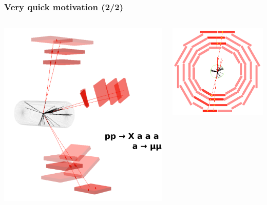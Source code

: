 \documentclass[compress]{beamer}
\begin{document}
\begin{frame}
\frametitle{Very quick motivation (2/2)}

\begin{columns}
\includegraphics[width=\linewidth]{eventdisplay_3d.pdf}

\vspace{0.5 cm}
\includegraphics[width=\linewidth]{eventdisplay_rphi.png}


\end{columns}
\end{frame}
\end{document}
